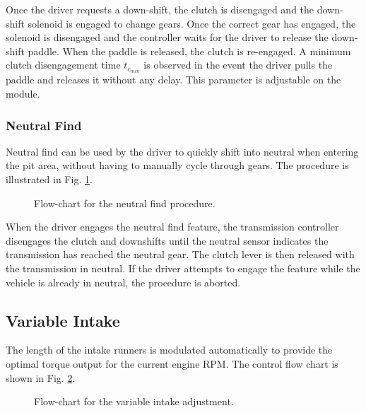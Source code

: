 Once the driver requests a down-shift, the clutch is disengaged and the down-shift solenoid is engaged to change gears. Once the correct gear has engaged, the solenoid is disengaged and the controller waits for the driver to release the down-shift paddle. When the paddle is released, the clutch is re-engaged. A minimum clutch disengagement time $t_{c_{min}}$ is observed in the event the driver pulls the paddle and releases it without any delay. This parameter is adjustable on the module.


\subsubsection{Neutral Find}

Neutral find can be used by the driver to quickly shift into neutral when entering the pit area, without having to manually cycle through gears. The procedure is illustrated in Fig. \ref{fig:transmission_neutralfind_flow}.

\begin{figure}[H]
	\centering
	
	\caption{Flow-chart for the neutral find procedure.}
	\label{fig:transmission_neutralfind_flow}
\end{figure}

When the driver engages the neutral find feature, the transmission controller disengages the clutch and downshifts until the neutral sensor indicates the transmission has reached the neutral gear. The clutch lever is then released with the transmission in neutral. If the driver attempts to engage the feature while the vehicle is already in neutral, the procedure is aborted.

\subsection{Variable Intake}

The length of the intake runners is modulated automatically to provide the optimal torque output for the current engine RPM. The control flow chart is shown in Fig. \ref{fig:engine_varintake_flow}. 

\begin{figure}[H]
	\centering
	
	\caption{Flow-chart for the variable intake adjustment.}
	\label{fig:engine_varintake_flow}
\end{figure}

